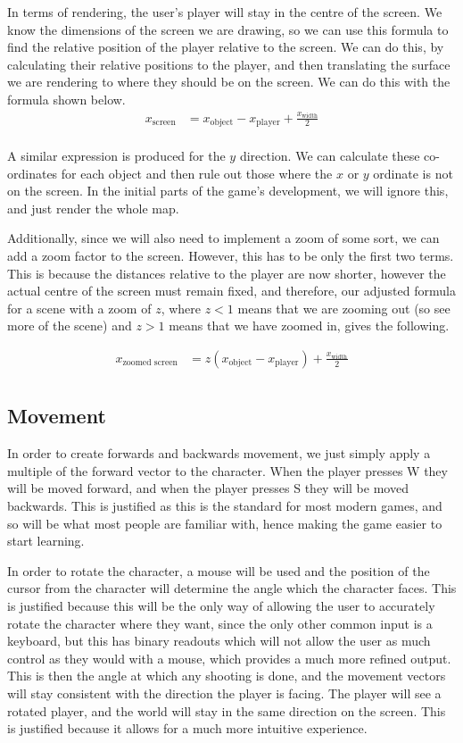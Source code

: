 \vs
In terms of rendering, the user's player will stay in the centre of the screen. We know the dimensions of the screen we are drawing, so we can use this formula to find the relative position of the player relative to the screen. We can do this, by calculating their relative positions to the player, and then translating the surface we are rendering to where they should be on the screen. We can do this with the formula shown below.
\begin{align*}
    x_\text{screen} &= x_\text{object} - x_\text{player} + \frac{x_\text{width}}{2}\\
\end{align*}

A similar expression is produced for the $y$ direction. We can calculate these co-ordinates for each object and then rule out those where the $x$ or $y$ ordinate is not on the screen. In the initial parts of the game's development, we will ignore this, and just render the whole map.

\vs
Additionally, since we will also need to implement a zoom of some sort, we can add a zoom factor to the screen. However, this has to be only the first two terms. This is because the distances relative to the player are now shorter, however the actual centre of the screen must remain fixed, and therefore, our adjusted formula for a scene with a zoom of $z$, where $z < 1$ means that we are zooming out (so see more of the scene) and $z>1$ means that we have zoomed in, gives the following.

\begin{align*}
    x_\text{zoomed screen} &= z(x_\text{object} - x_\text{player}) + \frac{x_\text{width}}{2}\\
\end{align*}


\subsection{Movement}

In order to create forwards and backwards movement, we just simply apply a multiple of the forward vector to the character. When the player presses W they will be moved forward, and when the player presses S they will be moved backwards. This is justified as this is the standard for most modern games, and so will be what most people are familiar with, hence making the game easier to start learning.


\vs
In order to rotate the character, a mouse will be used and the position of the cursor from the character will determine the angle which the character faces. This is justified because this will be the only way of allowing the user to accurately rotate the character where they want, since the only other common input is a keyboard, but this has binary readouts which will not allow the user as much control as they would with a mouse, which provides a much more refined output. This is then the angle at which any shooting is done, and the movement vectors will stay consistent with the direction the player is facing. The player will see a rotated player, and the world will stay in the same direction on the screen. This is justified because it allows for a much more intuitive experience. 


